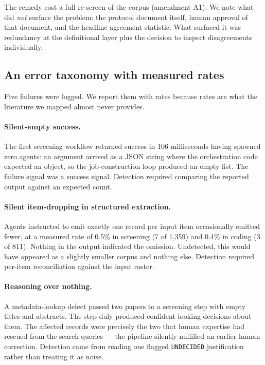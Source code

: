 The remedy cost a full re-screen of the corpus (amendment A1). We note what did \emph{not}
surface the problem: the protocol document itself, human approval of that document, and the
headline agreement statistic. What surfaced it was redundancy at the definitional layer plus
the decision to inspect disagreements individually.

\subsection{An error taxonomy with measured rates}

Five failures were logged. We report them with rates because rates are what the literature
we mapped almost never provides.

\paragraph{Silent-empty success.} The first screening workflow returned success in 106
milliseconds having spawned zero agents: an argument arrived as a JSON string where the
orchestration code expected an object, so the job-construction loop produced an empty list.
The failure signal was a success signal. Detection required comparing the reported output
against an expected count.

\paragraph{Silent item-dropping in structured extraction.} Agents instructed to emit exactly
one record per input item occasionally emitted fewer, at a measured rate of 0.5\% in screening
(7 of 1{,}359) and 0.4\% in coding (3 of 811). Nothing in the output indicated the omission.
Undetected, this would have appeared as a slightly smaller corpus and nothing else. Detection
required per-item reconciliation against the input roster.

\paragraph{Reasoning over nothing.} A metadata-lookup defect passed two papers to a screening
step with empty titles and abstracts. The step duly produced confident-looking decisions about
them. The affected records were precisely the two that human expertise had rescued from the
search queries --- the pipeline silently nullified an earlier human correction. Detection came
from reading one flagged \texttt{UNDECIDED} justification rather than treating it as noise.

